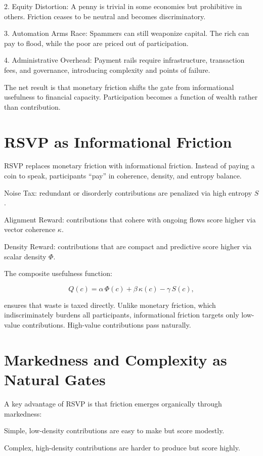 \documentclass{book}
\begin{document}
2. Equity Distortion: A penny is trivial in some economies but prohibitive in others. Friction ceases to be neutral and becomes discriminatory.

3. Automation Arms Race: Spammers can still weaponize capital. The rich can pay to flood, while the poor are priced out of participation.

4. Administrative Overhead: Payment rails require infrastructure, transaction fees, and governance, introducing complexity and points of failure.

The net result is that monetary friction shifts the gate from informational usefulness to financial capacity. Participation becomes a function of wealth rather than contribution.

\section{RSVP as Informational Friction}

RSVP replaces monetary friction with informational friction. Instead of paying a coin to speak, participants “pay” in coherence, density, and entropy balance.

Noise Tax: redundant or disorderly contributions are penalized via high entropy \( S \).

Alignment Reward: contributions that cohere with ongoing flows score higher via vector coherence \( \kappa \).

Density Reward: contributions that are compact and predictive score higher via scalar density \( \Phi \).

The composite usefulness function:

\[ Q(c) = \alpha \, \Phi(c) + \beta \, \kappa(c) - \gamma \, S(c), \]

ensures that waste is taxed directly. Unlike monetary friction, which indiscriminately burdens all participants, informational friction targets only low-value contributions. High-value contributions pass naturally.

\section{Markedness and Complexity as Natural Gates}

A key advantage of RSVP is that friction emerges organically through markedness:

Simple, low-density contributions are easy to make but score modestly.

Complex, high-density contributions are harder to produce but score highly.
\end{document}
